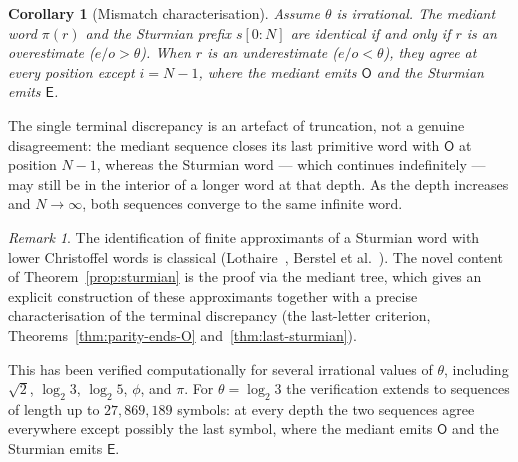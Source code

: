 \documentclass[12pt]{article}
\newtheorem{corollary}[theorem]{Corollary}
\theoremstyle{definition}
\theoremstyle{remark}
\newtheorem{remark}[theorem]{Remark}
\theoremstyle{plain}
\newcommand{\OO}{\mathsf{O}}
\newcommand{\EE}{\mathsf{E}}
\begin{document}
\begin{corollary}[Mismatch characterisation]
\label{cor:mismatch}
Assume $\theta$ is irrational.
The mediant word $\pi(r)$ and the Sturmian prefix $s[0{:}N]$ are identical
if and only if $r$ is an overestimate ($e/o > \theta$).
When $r$ is an underestimate ($e/o < \theta$), they agree at every position except
$i = N-1$, where the mediant emits $\OO$ and the Sturmian emits $\EE$.
\end{corollary}

The single terminal discrepancy is an artefact of truncation, not a genuine
disagreement: the mediant sequence closes its last primitive word with $\OO$ at
position $N-1$, whereas the Sturmian word --- which continues indefinitely --- may
still be in the interior of a longer word at that depth.
As the depth increases and $N \to \infty$, both sequences converge to the same
infinite word.

\begin{remark}
The identification of finite approximants of a Sturmian word with lower Christoffel
words is classical (Lothaire~\cite{lothaire2002}, Berstel et al.~\cite{berstel2009}).
The novel content of Theorem~\ref{prop:sturmian} is the proof via the mediant tree,
which gives an explicit construction of these approximants together with a precise
characterisation of the terminal discrepancy (the last-letter criterion,
Theorems~\ref{thm:parity-ends-O} and~\ref{thm:last-sturmian}).
\end{remark}

This has been verified computationally for several irrational values of $\theta$,
including $\sqrt{2}$, $\log_2 3$, $\log_2 5$, $\phi$, and $\pi$.
For $\theta = \log_2 3$ the verification extends to sequences of length up to
$27{,}869{,}189$ symbols: at every depth the two sequences agree everywhere except
possibly the last symbol, where the mediant emits $\OO$ and the Sturmian emits $\EE$.
\end{document}
